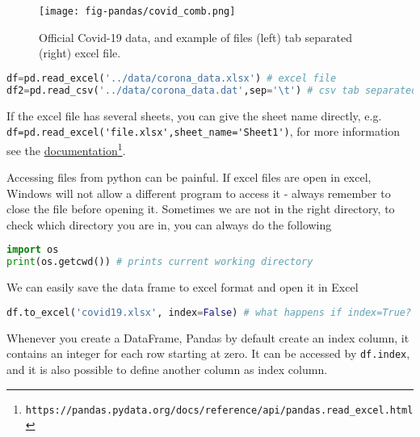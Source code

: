 \documentclass[graybox,sectrefs,envcountresetchap,open=right,final]{svmonodo}
\newenvironment{graybox2admon}[1][]{
\begin{graybox2mdframed}[frametitle=#1]
}
{
\end{graybox2mdframed}
}
\begin{document}
\begin{figure}[!ht]  %
  \centerline{\texttt{[image: fig-pandas/covid\_comb.png]}}
  \caption{
  Official Covid-19 data, and example of files (left) tab separated (right) excel file. \label{fig:file}
  }
\end{figure}




\begin{lstlisting}[language=python,style=blue1bar]
df=pd.read_excel('../data/corona_data.xlsx') # excel file
df2=pd.read_csv('../data/corona_data.dat',sep='\t') # csv tab separated file

\end{lstlisting}

If the excel file has several sheets, you can give the sheet name directly, e.g. \Verb!df=pd.read_excel('file.xlsx',sheet_name='Sheet1')!, for more information see the \href{{https://pandas.pydata.org/docs/reference/api/pandas.read_excel.html}}{documentation}\footnote{\texttt{https://pandas.pydata.org/docs/reference/api/pandas.read\_excel.html}}. 



\begin{graybox2admon}[Accessing files]
Accessing files from python can be painful. If excel files are open in excel, Windows will not allow a different program to access it - always remember to close the file before opening it. Sometimes we are not in the right directory, to check which directory you are in, you can always do the following



\begin{lstlisting}[language=python,style=blue1bar]
import os
print(os.getcwd()) # prints current working directory

\end{lstlisting}
\end{graybox2admon}




We can easily save the data frame to excel format and open it in Excel


\begin{lstlisting}[language=python,style=blue1bar]
df.to_excel('covid19.xlsx', index=False) # what happens if index=True?

\end{lstlisting}




\begin{graybox2admon}[Index column]
Whenever you create a DataFrame, Pandas by default create an index column, it contains an integer for each row starting at zero. It can be accessed by \texttt{df.index}, and it is also possible to define another column as index column.
\end{graybox2admon}
\end{document}
